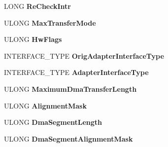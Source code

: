 \begin{DoxyCompactItemize}
\item 
\mbox{\label{struct___h_w___d_e_v_i_c_e___e_x_t_e_n_s_i_o_n_a6d1dc6a6bd0fb380ef64f7f1ea3f9d48}} 
L\+O\+NG {\bfseries Re\+Check\+Intr}
\item 
\mbox{\label{struct___h_w___d_e_v_i_c_e___e_x_t_e_n_s_i_o_n_ab1f0091ab82778830e070ae73116e3f7}} 
U\+L\+O\+NG {\bfseries Max\+Transfer\+Mode}
\item 
\mbox{\label{struct___h_w___d_e_v_i_c_e___e_x_t_e_n_s_i_o_n_ac316b736d326c394e0059c3d9d04e300}} 
U\+L\+O\+NG {\bfseries Hw\+Flags}
\item 
\mbox{\label{struct___h_w___d_e_v_i_c_e___e_x_t_e_n_s_i_o_n_a977d500a916d7fec9571344cef2be295}} 
I\+N\+T\+E\+R\+F\+A\+C\+E\+\_\+\+T\+Y\+PE {\bfseries Orig\+Adapter\+Interface\+Type}
\item 
\mbox{\label{struct___h_w___d_e_v_i_c_e___e_x_t_e_n_s_i_o_n_a6906be0a0bc1d8a6b5f6ce8ddb7a49ed}} 
I\+N\+T\+E\+R\+F\+A\+C\+E\+\_\+\+T\+Y\+PE {\bfseries Adapter\+Interface\+Type}
\item 
\mbox{\label{struct___h_w___d_e_v_i_c_e___e_x_t_e_n_s_i_o_n_a8f0f465b0cdf623b58076b63c7907a4f}} 
U\+L\+O\+NG {\bfseries Maximum\+Dma\+Transfer\+Length}
\item 
\mbox{\label{struct___h_w___d_e_v_i_c_e___e_x_t_e_n_s_i_o_n_a80eb0118546b819717f08660bb5b8580}} 
U\+L\+O\+NG {\bfseries Alignment\+Mask}
\item 
\mbox{\label{struct___h_w___d_e_v_i_c_e___e_x_t_e_n_s_i_o_n_a7a04eb67c9485165d614514eb6f90e86}} 
U\+L\+O\+NG {\bfseries Dma\+Segment\+Length}
\item 
\mbox{\label{struct___h_w___d_e_v_i_c_e___e_x_t_e_n_s_i_o_n_ae1be128485fc5164361c8510d8bc04e8}} 
U\+L\+O\+NG {\bfseries Dma\+Segment\+Alignment\+Mask}

\end{DoxyCompactItemize}
